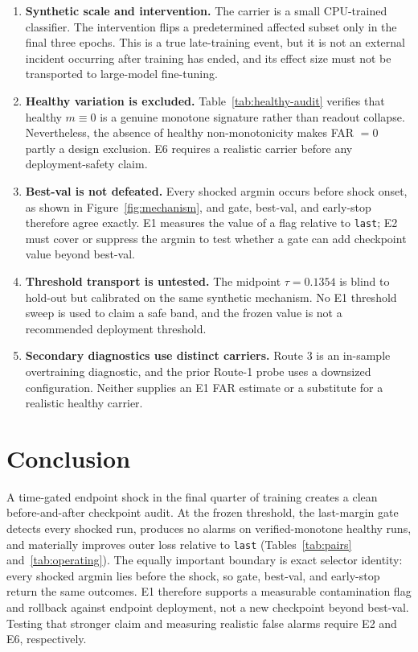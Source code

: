 \documentclass{article} %
\theoremstyle{remark}
\begin{document}
\begin{enumerate}
\item \textbf{Synthetic scale and intervention.} The carrier is a small CPU-trained classifier.
The intervention flips a predetermined affected subset only in the final three epochs. This is a
true late-training event, but it is not an external incident occurring after training has ended,
and its effect size must not be transported to large-model fine-tuning.
\item \textbf{Healthy variation is excluded.} Table~\ref{tab:healthy-audit} verifies that healthy
$m\equiv0$ is a genuine monotone signature rather than readout collapse. Nevertheless, the absence
of healthy non-monotonicity makes FAR $=0$ partly a design exclusion. E6 requires a realistic
carrier before any deployment-safety claim.
\item \textbf{Best-val is not defeated.} Every shocked argmin occurs before shock onset, as shown
in Figure~\ref{fig:mechanism}, and gate, best-val, and early-stop therefore agree exactly. E1
measures the value of a flag relative to \texttt{last}; E2 must cover or suppress the argmin to test
whether a gate can add checkpoint value beyond best-val.
\item \textbf{Threshold transport is untested.} The midpoint $\tau=0.1354$ is blind to hold-out but
calibrated on the same synthetic mechanism. No E1 threshold sweep is used to claim a safe band, and
the frozen value is not a recommended deployment threshold.
\item \textbf{Secondary diagnostics use distinct carriers.} Route 3 is an in-sample overtraining
diagnostic, and the prior Route-1 probe uses a downsized configuration. Neither supplies an E1 FAR
estimate or a substitute for a realistic healthy carrier.
\end{enumerate}

\section{Conclusion}
\label{sec:conclusion}

A time-gated endpoint shock in the final quarter of training creates a clean before-and-after
checkpoint audit. At the frozen threshold, the last-margin gate detects every shocked run,
produces no alarms on verified-monotone healthy runs, and materially improves outer loss relative
to \texttt{last} (Tables~\ref{tab:pairs} and~\ref{tab:operating}). The equally important boundary is
exact selector identity: every shocked argmin lies before the shock, so gate, best-val, and
early-stop return the same outcomes. E1 therefore supports a measurable contamination flag and
rollback against endpoint deployment, not a new checkpoint beyond best-val. Testing that stronger
claim and measuring realistic false alarms require E2 and E6, respectively.
\end{document}
